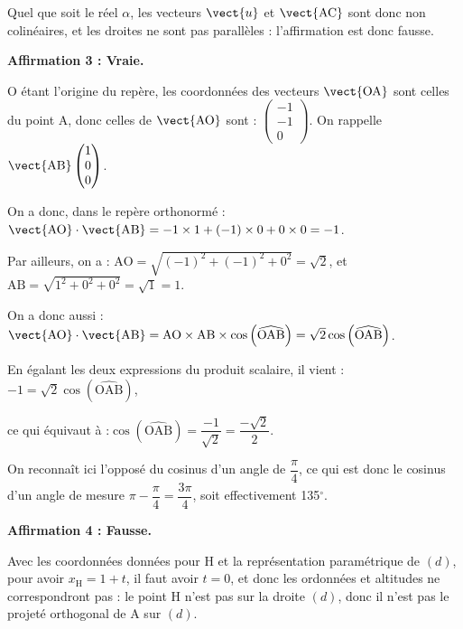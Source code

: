 Quel que soit le réel $\alpha$, les vecteurs $ \vect{u} $ et $ \vect{\mathrm{AC}} $ sont donc non colinéaires, et les droites ne sont pas parallèles : l'affirmation est donc fausse.

\medskip

\textbf{Affirmation 3 : Vraie.}

O étant l'origine du repère, les coordonnées des vecteurs $ \vect{\mathrm{OA}} $ sont celles du point A, donc celles de $ \vect{\mathrm{AO}} $ sont : $ \begin{pmatrix}-1\\-1\\0\end{pmatrix}$. On rappelle $ \vect{\mathrm{AB}}\begin{pmatrix} 1 \\ 0 \\ 0\end{pmatrix} $.

On a donc, dans le repère orthonormé : \quad$ \vect{\mathrm{AO}} \cdot \vect{\mathrm{AB}} = -1 \times 1 + (-1) \times 0 + 0 \times 0 = -1$.

Par ailleurs, on a : \quad $ \mathrm{AO} = \sqrt{(-1)^2 + (-1)^2 + 0^2} = \sqrt{2} $, \quad et \quad $ \mathrm{AB} = \sqrt{1^2 + 0^2 + 0^2} = \sqrt{1} = 1$.

On a donc aussi : \quad $ \vect{\mathrm{AO}} \cdot \vect{\mathrm{AB}} = \mathrm{AO} \times \mathrm{AB} \times \cos \left( \widehat{\mathrm{OAB}}\right) = \sqrt{2} \cos \left( \widehat{\mathrm{OAB}}\right)$.

En égalant les deux expressions du produit scalaire, il vient :
\quad $-1 = \sqrt{2}\cos \left(\widehat{\mathrm{OAB}}\right)$,

ce qui équivaut à :\quad $\cos \left(\widehat{\mathrm{OAB}}\right) = \dfrac{-1}{\sqrt{2}} = \dfrac{-\sqrt{2}}{2}$.

On reconnaît ici l'opposé du cosinus d'un angle de $ \dfrac{\pi}{4} $, ce qui est donc le cosinus d'un angle de mesure $\pi - \dfrac{\pi}{4} = \dfrac{3\pi}{4}$, soit effectivement 135\ensuremath{^\circ}.

\medskip

\textbf{Affirmation 4 : Fausse.}

Avec les coordonnées données pour H et la représentation paramétrique de $(d)$, pour avoir $x_\mathrm{H} = 1 + t$, il faut avoir $t = 0$, et donc les ordonnées et altitudes ne correspondront pas : le point H n'est pas sur la droite $(d)$, donc il n'est pas le projeté orthogonal de A sur $(d)$.

